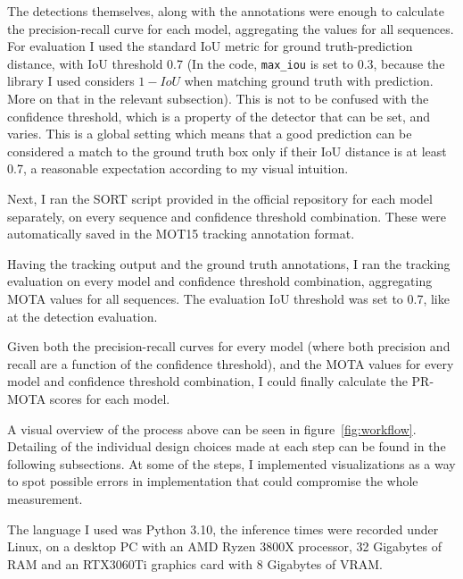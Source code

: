 The detections themselves, along with the annotations were enough to calculate the precision-recall curve for each model, aggregating the values for all sequences. For evaluation I used the standard IoU metric for ground truth-prediction distance, with IoU threshold 0.7 (In the code, \verb|max_iou| is set to 0.3, because the library I used considers $1-IoU$ when matching ground truth with prediction. More on that in the relevant subsection). This is not to be confused with the confidence threshold, which is a property of the detector that can be set, and varies. This is a global setting which means that a good prediction can be considered a match to the ground truth box only if their IoU distance is at least 0.7, a reasonable expectation according to my visual intuition.

Next, I ran the SORT script provided in the official repository for each model separately, on every sequence and confidence threshold combination. These were automatically saved in the MOT15 tracking annotation format.

Having the tracking output and the ground truth annotations, I ran the tracking evaluation on every model and confidence threshold combination, aggregating MOTA values for all sequences. The evaluation IoU threshold was set to 0.7, like at the detection evaluation.

Given both the precision-recall curves for every model (where both precision and recall are a function of the confidence threshold), and the MOTA values for every model and confidence threshold combination, I could finally calculate the PR-MOTA scores for each model.

A visual overview of the process above can be seen in figure~\ref{fig:workflow}. Detailing of the individual design choices made at each step can be found in the following subsections. At some of the steps, I implemented visualizations as a way to spot possible errors in implementation that could compromise the whole measurement. 

The language I used was Python 3.10, the inference times were recorded under Linux, on a desktop PC with an AMD Ryzen 3800X processor, 32 Gigabytes of RAM and an RTX3060Ti graphics card with 8 Gigabytes of VRAM. 

